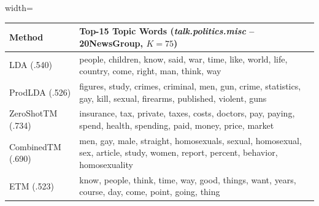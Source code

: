 \documentclass{article}
\theoremstyle{plain}
\theoremstyle{definition}
\theoremstyle{remark}
\begin{document}
\begin{table}[t]
\begin{adjustbox}{width=\linewidth}
\begin{tabular}{@{}l l@{}}
\midrule
\textbf{Method} & \textbf{Top-15 Topic Words (\textit{talk.politics.misc} -- 20NewsGroup, $K=75$)} \\
\midrule
{\tiny LDA (.540)} & \textcolor{green!90!black}{people}, \textcolor{green!90!black}{children}, \textcolor{black!70}{know}, \textcolor{green!60!black}{said}, \textcolor{green!40!black}{war}, \textcolor{black!40}{time}, \textcolor{black!40}{like}, \textcolor{black!70}{world}, \textcolor{green!90!black}{life}, \textcolor{green!40!black}{country}, \textcolor{green!60!black}{come}, \textcolor{black!70}{right}, \textcolor{green!40!black}{man}, \textcolor{green!60!black}{think}, \textcolor{black!40}{way} \\
{\tiny ProdLDA (.526)} & \textcolor{green!40!black}{figures}, \textcolor{green!40!black}{study}, \textcolor{green!60!black}{crimes}, \textcolor{green!90!black}{criminal}, \textcolor{black!70}{men}, \textcolor{green!90!black}{gun}, \textcolor{green!60!black}{crime}, \textcolor{black!70}{statistics}, \textcolor{black!40}{gay}, \textcolor{black!70}{kill}, \textcolor{black!40}{sexual}, \textcolor{green!40!black}{firearms}, \textcolor{black!40}{published}, \textcolor{green!90!black}{violent}, \textcolor{green!60!black}{guns} \\
{\tiny ZeroShotTM (.734)} & \textcolor{green!60!black}{insurance}, \textcolor{green!40!black}{tax}, \textcolor{black!40}{private}, \textcolor{green!90!black}{taxes}, \textcolor{green!40!black}{costs}, \textcolor{black!40}{doctors}, \textcolor{green!90!black}{pay}, \textcolor{green!60!black}{paying}, \textcolor{black!70}{spend}, \textcolor{green!40!black}{health}, \textcolor{black!70}{spending}, \textcolor{green!60!black}{paid}, \textcolor{green!90!black}{money}, \textcolor{black!40}{price}, \textcolor{black!70}{market} \\
{\tiny CombinedTM (.690)} & \textcolor{green!40!black}{men}, \textcolor{green!90!black}{gay}, \textcolor{green!60!black}{male}, \textcolor{black!40}{straight}, \textcolor{green!60!black}{homosexuals}, \textcolor{green!90!black}{sexual}, \textcolor{green!40!black}{homosexual}, \textcolor{green!90!black}{sex}, \textcolor{black!40}{article}, \textcolor{black!70}{study}, \textcolor{black!70}{women}, \textcolor{black!40}{report}, \textcolor{black!70}{percent}, \textcolor{green!40!black}{behavior}, \textcolor{green!60!black}{homosexuality} \\
{\tiny ETM (.523)} & \textcolor{green!60!black}{know}, \textcolor{green!60!black}{people}, \textcolor{green!90!black}{think}, \textcolor{black!40}{time}, \textcolor{green!40!black}{way}, \textcolor{black!70}{good}, \textcolor{green!90!black}{things}, \textcolor{black!70}{want}, \textcolor{black!40}{years}, \textcolor{green!40!black}{course}, \textcolor{black!40}{day}, \textcolor{green!40!black}{come}, \textcolor{black!70}{point}, \textcolor{green!90!black}{going}, \textcolor{green!60!black}{thing} \\

\end{tabular}
\end{adjustbox}
\end{table}
\end{document}
